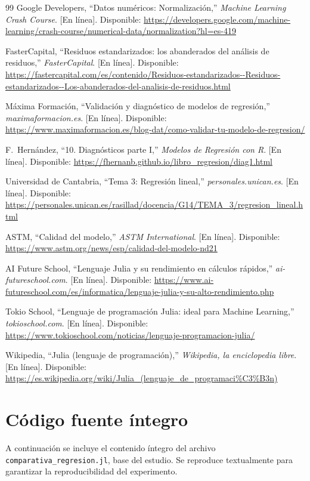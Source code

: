 \documentclass[11pt,a4paper]{article}
\begin{document}
\begin{thebibliography}{99}
 Google Developers, ``Datos numéricos: Normalización,'' \textit{Machine Learning Crash Course}. [En línea]. Disponible: \url{https://developers.google.com/machine-learning/crash-course/numerical-data/normalization?hl=es-419}

 FasterCapital, ``Residuos estandarizados: los abanderados del análisis de residuos,'' \textit{FasterCapital}. [En línea]. Disponible: \url{https://fastercapital.com/es/contenido/Residuos-estandarizados--Residuos-estandarizados--Los-abanderados-del-analisis-de-residuos.html}

 Máxima Formación, ``Validación y diagnóstico de modelos de regresión,'' \textit{maximaformacion.es}. [En línea]. Disponible: \url{https://www.maximaformacion.es/blog-dat/como-validar-tu-modelo-de-regresion/}

 F.\ Hernández, ``10. Diagnósticos parte I,'' \textit{Modelos de Regresión con R}. [En línea]. Disponible: \url{https://fhernanb.github.io/libro_regresion/diag1.html}

 Universidad de Cantabria, ``Tema 3: Regresión lineal,'' \textit{personales.unican.es}. [En línea]. Disponible: \url{https://personales.unican.es/rasillad/docencia/G14/TEMA_3/regresion_lineal.html}

 ASTM, ``Calidad del modelo,'' \textit{ASTM International}. [En línea]. Disponible: \url{https://www.astm.org/news/esp/calidad-del-modelo-nd21}

 AI Future School, ``Lenguaje Julia y su rendimiento en cálculos rápidos,'' \textit{ai-futureschool.com}. [En línea]. Disponible: \url{https://www.ai-futureschool.com/es/informatica/lenguaje-julia-y-su-alto-rendimiento.php}

 Tokio School, ``Lenguaje de programación Julia: ideal para Machine Learning,'' \textit{tokioschool.com}. [En línea]. Disponible: \url{https://www.tokioschool.com/noticias/lenguaje-programacion-julia/}

 Wikipedia, ``Julia (lenguaje de programación),'' \textit{Wikipedia, la enciclopedia libre}. [En línea]. Disponible: \url{https://es.wikipedia.org/wiki/Julia_(lenguaje_de_programaci\%C3\%B3n)}
\end{thebibliography}

\appendix
\section{Código fuente íntegro}

A continuación se incluye el contenido íntegro del archivo \texttt{comparativa\_regresion.jl}, base del estudio. Se reproduce textualmente para garantizar la reproducibilidad del experimento.


\end{document}
